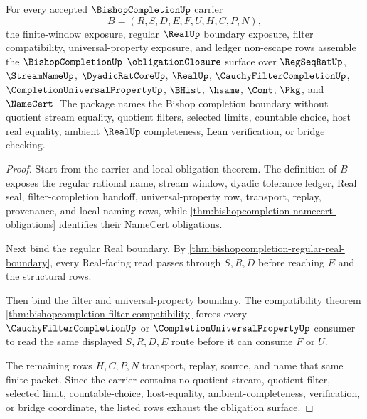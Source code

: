 \begin{theorem}
\label{thm:bishopcompletion-obligation-closure-package}
For every accepted $\BishopCompletionUp$ carrier
$$
B=(R,S,D,E,F,U,H,C,P,N),
$$
the finite-window exposure, regular $\RealUp$ boundary exposure, filter compatibility, universal-property exposure, and ledger non-escape rows assemble the $\BishopCompletionUp$ $\obligationClosure$ surface over $\RegSeqRatUp$, $\StreamNameUp$, $\DyadicRatCoreUp$, $\RealUp$, $\CauchyFilterCompletionUp$, $\CompletionUniversalPropertyUp$, $\BHist$, $\hsame$, $\Cont$, $\Pkg$, and $\NameCert$. The package names the Bishop completion boundary without quotient stream equality, quotient filters, selected limits, countable choice, host real equality, ambient $\RealUp$ completeness, Lean verification, or bridge checking.
\end{theorem}
\begin{proof}
Start from the carrier and local obligation theorem. The definition of $B$ exposes the regular rational name, stream window, dyadic tolerance ledger, Real seal, filter-completion handoff, universal-property row, transport, replay, provenance, and local naming rows, while \autoref{thm:bishopcompletion-namecert-obligations} identifies their NameCert obligations.

Next bind the regular Real boundary. By \autoref{thm:bishopcompletion-regular-real-boundary}, every Real-facing read passes through $S,R,D$ before reaching $E$ and the structural rows.

Then bind the filter and universal-property boundary. The compatibility theorem \autoref{thm:bishopcompletion-filter-compatibility} forces every $\CauchyFilterCompletionUp$ or $\CompletionUniversalPropertyUp$ consumer to read the same displayed $S,R,D,E$ route before it can consume $F$ or $U$.

The remaining rows $H,C,P,N$ transport, replay, source, and name that same finite packet. Since the carrier contains no quotient stream, quotient filter, selected limit, countable-choice, host-equality, ambient-completeness, verification, or bridge coordinate, the listed rows exhaust the obligation surface.
\end{proof}


